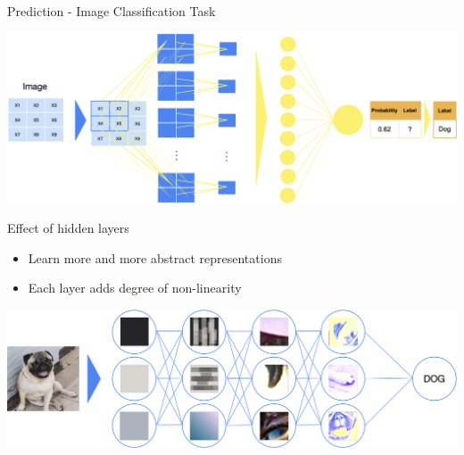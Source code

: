 \documentclass[11pt,compress,t,notes=noshow, xcolor=table]{beamer}
\begin{document}
\begin{vbframe}{Prediction - Image Classification Task}
\vspace{0.5cm}
\begin{center}
   \includegraphics[width = \textwidth]{figure_man/nutshell-nn-prediction.png}    
\end{center}

\end{vbframe}


\begin{vbframe}{Effect of hidden layers}
\begin{itemize}
    \small \item Learn more and more abstract representations
    \small \item Each layer adds degree of non-linearity
\end{itemize}
\vspace{1cm}
\begin{center}
   \includegraphics[width = \textwidth]{figure_man/nutshell-nn-hidden-layers.png}    
\end{center}

\end{vbframe}


\endlecture
\end{document}
